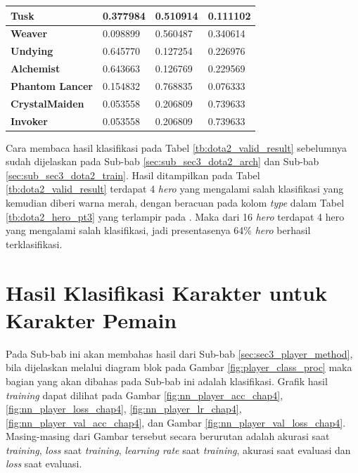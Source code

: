 \begin{longtable}{|l|l|l|l|}
	\textbf{Tusk} & 0.377984 & {\color[HTML]{FE0000} 0.510914} & 0.111102 \\ \hline
	\rowcolor[HTML]{FFFFFF} 
	\textbf{Weaver} & 0.098899 & {\color[HTML]{036400} 0.560487} & 0.340614 \\ \hline
	\rowcolor[HTML]{FFFFFF} 
	\textbf{Undying} & {\color[HTML]{036400} 0.645770} & 0.127254 & 0.226976 \\ \hline
	\rowcolor[HTML]{FFFFFF} 
	\textbf{Alchemist} & {\color[HTML]{036400} 0.643663} & 0.126769 & 0.229569 \\ \hline
	\rowcolor[HTML]{FFFFFF} 
	\textbf{Phantom Lancer} & 0.154832 & {\color[HTML]{036400} 0.768835} & 0.076333 \\ \hline
	\rowcolor[HTML]{FFFFFF} 
	\textbf{CrystalMaiden} & 0.053558 & 0.206809 & {\color[HTML]{036400} 0.739633} \\ \hline
	\rowcolor[HTML]{FFFFFF} 
	\textbf{Invoker} & 0.053558 & 0.206809 & {\color[HTML]{036400} 0.739633} \\ \hline
\end{longtable}

Cara membaca hasil klasifikasi pada Tabel \ref{tb:dota2_valid_result} sebelumnya sudah dijelaskan pada Sub-bab \ref{sec:sub_sec3_dota2_arch} dan Sub-bab \ref{sec:sub_sec3_dota2_train}. Hasil ditampilkan pada Tabel \ref{tb:dota2_valid_result} terdapat 4 \textit{hero} yang mengalami salah klasifikasi yang kemudian diberi warna merah, dengan beracuan pada kolom \textit{type} dalam Tabel \ref{tb:dota2_hero_pt3} yang terlampir pada . Maka dari 16 \textit{hero} terdapat 4 hero yang mengalami salah klasifikasi, jadi presentasenya 64\% \textit{hero} berhasil terklasifikasi.
\vspace{1ex}

\section{Hasil Klasifikasi Karakter untuk Karakter Pemain}
\label{sec:sec4_eval_player}
\vspace{1ex}

Pada Sub-bab ini akan membahas hasil dari Sub-bab \ref{sec:sec3_player_method}, bila dijelaskan melalui diagram blok pada Gambar \ref{fig:player_class_proc} maka bagian yang akan dibahas pada Sub-bab ini adalah klasifikasi. Grafik hasil \textit{training} dapat dilihat pada Gambar \ref{fig:nn_player_acc_chap4}, \ref{fig:nn_player_loss_chap4}, \ref{fig:nn_player_lr_chap4}, \ref{fig:nn_player_val_acc_chap4}, dan Gambar \ref{fig:nn_player_val_loss_chap4}. Masing-masing dari Gambar tersebut secara berurutan adalah akurasi saat \textit{training}, \textit{loss} saat \textit{training}, \textit{learning rate} saat \textit{training}, akurasi saat evaluasi dan \textit{loss} saat evaluasi.
\vspace{2ex}

